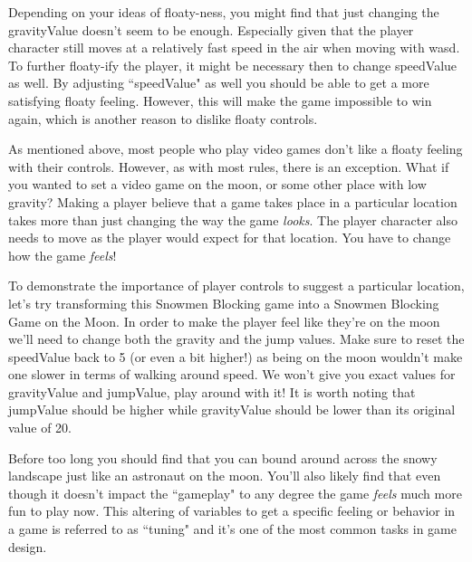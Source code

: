 \documentclass{article}
\begin{document}
\noindent{}

Depending on your ideas of floaty-ness, you might find that just changing the gravityValue doesn't seem to be enough. Especially given that the player character still moves at a relatively fast speed in the air when moving with wasd. To further floaty-ify the player, it might be necessary then to change speedValue as well. By adjusting ``speedValue" as well you should be able to get a more satisfying floaty feeling. However, this will make the game impossible to win again, which is another reason to dislike floaty controls.

As mentioned above, most people who play video games don't like a floaty feeling with their controls. However, as with most rules, there is an exception. What if you wanted to set a video game on the moon, or some other place with low gravity? Making a player believe that a game takes place in a particular location takes more than just changing the way the game \textit{looks}. The player character also needs to move as the player would expect for that location. You have to change how the game \textit{feels}!

To demonstrate the importance of player controls to suggest a particular location, let's try transforming this Snowmen Blocking game into a Snowmen Blocking Game on the Moon. In order to make the player feel like they're on the moon we'll need to change both the gravity and the jump values. Make sure to reset the speedValue back to 5 (or even a bit higher!) as being on the moon wouldn't make one slower in terms of walking around speed. We won't give you exact values for gravityValue and jumpValue, play around with it! It is worth noting that jumpValue should be higher while gravityValue should be lower than its original value of 20.

\noindent{}

Before too long you should find that you can bound around across the snowy landscape just like an astronaut on the moon. You'll also likely find that even though it doesn't impact the ``gameplay" to any degree the game \textit{feels} much more fun to play now. This altering of variables to get a specific feeling or behavior in a game is referred to as ``tuning" and it's one of the most common tasks in game design. 
\end{document}
